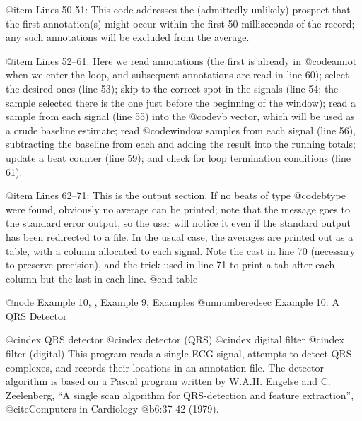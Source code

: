 {{{{{{{{{{@item Lines 50-51:
This code addresses the (admittedly unlikely) prospect that the first
annotation(s) might occur within the first 50 milliseconds of the
record; any such annotations will be excluded from the average.

@item Lines 52--61:
Here we read annotations (the first is already in @code{annot} when we
enter the loop, and subsequent annotations are read in line 60); select
the desired ones (line 53); skip to the correct spot in the signals (line
54; the sample selected there is the one just before the beginning of
the window); read a sample from each signal (line 55) into the @code{vb}
vector, which will be used as a crude baseline estimate; read
@code{window} samples from each signal (line 56), subtracting the
baseline from each and adding the result into the running totals; update
a beat counter (line 59); and check for loop termination conditions
(line 61).

@item Lines 62--71:
This is the output section.  If no beats of type @code{btype} were
found, obviously no average can be printed; note that the message goes
to the standard error output, so the user will notice it even if the
standard output has been redirected to a file.  In the usual case, the
averages are printed out as a table, with a column allocated to each
signal.  Note the cast in line 70 (necessary to preserve precision), and
the trick used in line 71 to print a tab after each column but the last
in each line.
@end table

@node     Example 10, , Example 9, Examples
@unnumberedsec Example 10: A QRS Detector

@cindex QRS detector
@cindex detector (QRS)
@cindex digital filter
@cindex filter (digital)
This program reads a single ECG signal, attempts to detect QRS complexes,
and records their locations in an annotation file.  The detector algorithm
is based on a Pascal program written by W.A.H. Engelse and C. Zeelenberg,
``A single scan algorithm for QRS-detection and feature extraction'',
@cite{Computers in Cardiology} @b{6}:37-42 (1979).

}}}}}}}}}}
